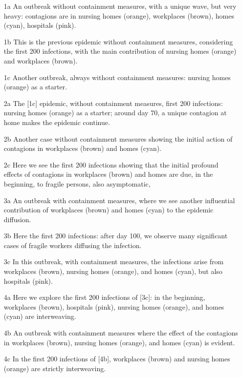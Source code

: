 \documentclass[graybox]{svmult}
\begin{document}
\begin{itemize}
\item [1a] An outbreak without containment measures, with a unique wave, but very heavy: contagions are in nursing homes (orange), workplaces (brown), homes (cyan), hospitals (pink).
\item [1b] This is the previous epidemic without containment measures, considering the first 200 infections, with the main contribution of nursing homes (orange) and workplaces (brown).
\item [1c] Another outbreak, always without containment measures: nursing homes (orange) as a starter.

\item [2a] The [1c] epidemic, without containment measures, first 200 infections: nursing homes (orange) as a starter; around day 70, a unique contagion at home makes the epidemic continue.
\item [2b] Another case without containment measures showing the initial action of contagions in workplaces (brown) and homes (cyan).
\item [2c] Here we see the first 200 infections showing that the initial profound effects of contagions in workplaces (brown) and homes are due, in the beginning, to fragile persons, also asymptomatic,

\item [3a] An outbreak with containment measures, where we see another influential contribution of workplaces (brown) and homes (cyan) to the epidemic diffusion.
\item [3b] Here the first 200 infections: after day 100, we observe many significant cases of fragile workers diffusing the infection.
\item [3c] In this outbreak, with containment measures, the infections arise from workplaces (brown), nursing homes (orange), and homes (cyan), but also hospitals (pink).

\item [4a] Here we explore the first 200 infections of [3c]: in the beginning, workplaces (brown), hospitals (pink), nursing homes (orange), and homes (cyan) are interweaving.
\item [4b] An outbreak with containment measures where the effect of the contagions in workplaces (brown), nursing homes (orange), and homes (cyan) is evident.
\item [4c] In the first 200 infections of [4b], workplaces (brown) and nursing homes (orange) are strictly interweaving.


\end{itemize}
\end{document}
